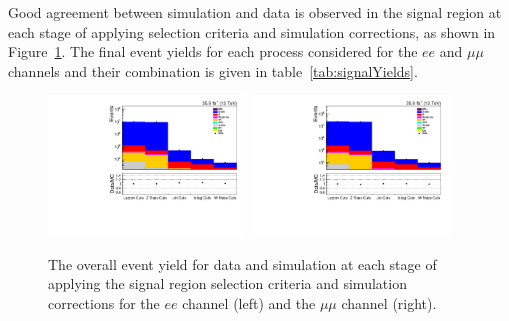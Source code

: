 Good agreement between simulation and data is observed in the signal region at each stage of applying selection criteria and simulation corrections, as shown in Figure~\ref{fig:SR_cutFlow}.
The final event yields for each process considered for the $ee$ and $\mu\mu$ channels and their combination is given in table~\ref{tab:signalYields}.

\begin{figure}[htbp]
\centering
\includegraphics[width=0.47\textwidth]{figs/background-estimation/plots/unblinded/prompt_ee_ttbarInc/cutFlow_log.pdf}
\includegraphics[width=0.47\textwidth]{figs/background-estimation/plots/unblinded/prompt_mumu_ttbarInc/cutFlow_log.pdf}
\caption{
The overall event yield for data and simulation at each stage of applying the signal region selection criteria and simulation corrections for the $ee$ channel (left) and the $\mu\mu$ channel (right).
}
\label{fig:SR_cutFlow}
\end{figure}


